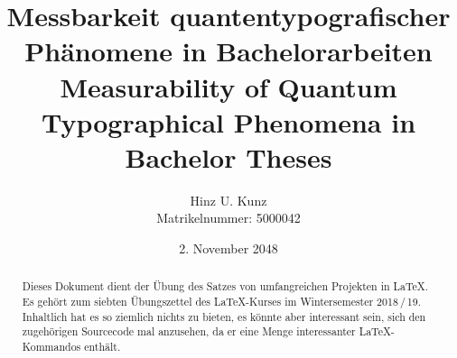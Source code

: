 \documentclass{scrreprt}
\begin{document}
\quad\thispagestyle{empty}\newpage
\titlehead{Ruprecht-Karls-Universität Heidelberg\\
Fakultät für Mathematik und Informatik\\
Institut für Informatik}
\subject{keine Bachelorarbeit}
\title{\Large
	Messbarkeit quantentypografischer Phänomene in Bachelorarbeiten\\
	Measurability of Quantum Typographical Phenomena in Bachelor Theses
}
\author{Hinz U. Kunz\\
\small Matrikelnummer: 5000042}
\publishers{nicht betreut durch Prof.\,Dr.\,max.\,mus. Termann}
\date{2. November 2048}
\extratitle{\centering Quantentypografie in Bachelorarbeiten}

\maketitle
\tableofcontents

\begin{abstract}
Dieses Dokument dient der Übung des Satzes von umfangreichen Projekten in \LaTeX{}. Es gehört zum siebten Übungszettel des \LaTeX-Kurses im Wintersemester 2018\,/\,19. Inhaltlich hat es so ziemlich nichts zu bieten, es könnte aber interessant sein, sich den zugehörigen Sourcecode mal anzusehen, da er eine Menge interessanter \LaTeX-Kommandos enthält.
\end{abstract}






\listoffigures
\listoftables
\end{document}
